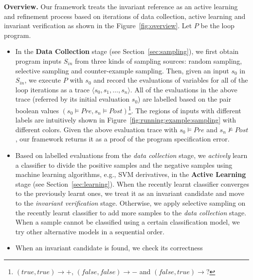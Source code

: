 \medskip\noindent
\textbf{Overview.}
Our framework treats the invariant reference as an active learning and refinement process 
based on iterations of data collection, active learning and invariant verification 
as shown in the Figure~\ref{fig:overview}. 
Let $P$ be the loop program. 
\begin{itemize}
    \item 
    In the \textbf{Data Collection} stage (see Section~\ref{sec:sampling}), 
    we first obtain program inputs $S_{\mathit{in}}$ from three kinds of sampling sources: 
    random sampling, selective sampling and counter-example sampling. 
    Then, given an input $s_0$ in $S_{\mathit{in}}$, we execute $P$ with $s_0$ 
    and record the evaluations of variables for all of the loop iterations
    as a trace $\langle s_0, s_1, \ldots, s_n \rangle$.  
    All of the evaluations in the above trace (referred by its initial evaluation $s_0$) 
    are labelled based on the pair boolean values 
    $(s_0 \models \mathit{Pre}, s_n \models \mathit{Post})$\footnote{
        $(\mathit{true}, \mathit{true}) \rightarrow +$, 
        $(\mathit{false}, \mathit{false}) \rightarrow -$ 
        and $(\mathit{false}, \mathit{true}) \rightarrow ?$}. 
    The regions of inputs with different labels are intuitively shown 
    in Figure~\ref{fig:running:example:sampling} with different colors. 
    Given the above evaluation trace with
    $s_0 \models \mathit{Pre}$ and $s_n \not\models \mathit{Post}$, 
    our framework returns it as a proof of the program specification error. 
    \item 
    Based on labelled evaluations from the \emph{data collection} stage, 
    we \emph{actively} learn a classifier to divide the positive samples and the negative samples 
    using machine learning algorithms, e.g., SVM derivatives, 
    in the \textbf{Active Learning} stage (see Section~\ref{sec:learning}). 
    When the recently learnt classifier converges to the previously learnt ones, 
    we treat it as an invariant candidate and move to the \emph{invariant verification} stage. 
    Otherwise, we apply selective sampling on the recently learnt classifier 
    to add more samples to the \emph{data collection} stage. 
    When a sample cannot be classified using a certain classification model, 
    we try other alternative models in a sequential order. 
    \item 
    When an invariant candidate is found, we check its correctness 

\end{itemize}
